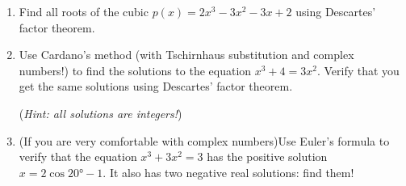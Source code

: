 \begin{exercises}{}{}
\begin{enumerate}
		
		\item Find all roots of the cubic $p(x)=2x^3-3x^2-3x+2$ using Descartes' factor theorem.
		
		
		\item Use Cardano's method (with Tschirnhaus substitution and complex numbers!) to find the solutions to the equation $x^3+4=3x^2$. Verify that you get the same solutions using Descartes' factor theorem.\par
		(\emph{Hint: all solutions are integers!})
	  
		
		\item (If you are very comfortable with complex numbers)\lstsp Use Euler's formula to verify that the equation $x^3+3x^2=3$ has the positive solution $x=2\cos\ang{20}-1$. It also has two negative real solutions: find them! 
	\end{enumerate}
\end{exercises}

\clearpage


